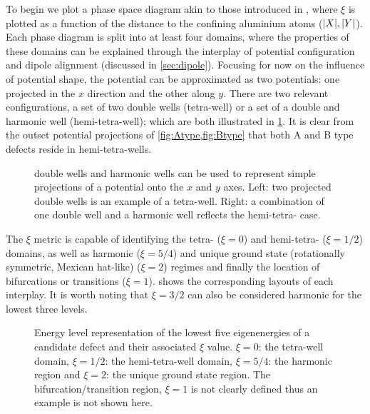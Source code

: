 To begin we plot a phase space diagram akin to those introduced in , where $\xi$ is plotted as a function of the distance to the confining aluminium atoms ($\lvert X\rvert,\lvert Y\rvert$).
Each phase diagram is split into at least four domains, where the properties of these domains can be explained through the interplay of potential configuration and dipole alignment (discussed in \cref{sec:dipole}).
Focusing for now on the influence of potential shape, the  potential can be approximated as two  potentials: one projected in the $x$ direction and the other along $y$.
There are two relevant configurations, a set of two double wells (tetra-well) or a set of a double and harmonic well (hemi-tetra-well); which are both illustrated in \cref{fig:mexhatproj}.
It is clear from the outset potential projections of \cref{fig:Atype,fig:Btype} that both A and B type defects reside in hemi-tetra-wells.

\begin{figure}[htp]
\resizebox{0.8\textwidth}{!}{}
\caption[Potential Projections]{\label{fig:mexhatproj} double wells  and harmonic wells  can be used to represent simple projections of a  potential onto the $x$ and $y$ axes. Left: two projected double wells is an example of a tetra-well. Right: a combination of one double well and a harmonic well reflects the hemi-tetra- case.}
\end{figure}

The $\xi$ metric is capable of identifying the tetra- ($\xi=0$) and hemi-tetra- ($\xi=1/2$) domains, as well as harmonic ($\xi=5/4$) and unique ground state (rotationally symmetric, Mexican hat-like) ($\xi=2$) regimes and finally the location of bifurcations or transitions ($\xi=1$).
 shows the corresponding layouts of each interplay.
It is worth noting that $\xi=3/2$ can also be considered harmonic for the lowest three levels.

\begin{figure}[htp]
  \resizebox{\textwidth}{!}{}
  \caption[$\xi$ metric]{\label{fig:ximetric}Energy level representation of the lowest five eigenenergies of a candidate defect and their associated $\xi$ value. $\xi=0$: the tetra-well domain, $\xi=1/2$: the hemi-tetra-well domain, $\xi=5/4$: the harmonic region and $\xi=2$: the unique ground state region. The bifurcation/transition region, $\xi=1$ is not clearly defined thus an example is not shown here.}
\end{figure}

